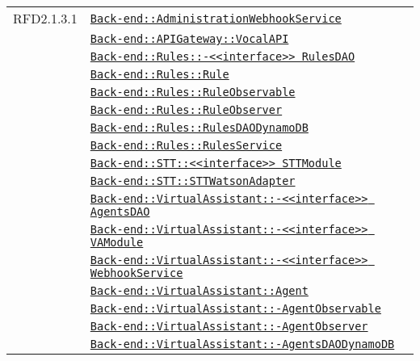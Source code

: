 \begin{longtable}{|>{\centering}m{3cm}|m{10cm}<{\centering}|}
RFD2.1.3.1 & \hyperref[Back-end::AdministrationWebhookService]{\texttt{Back-end::AdministrationWebhookService}}\\
& \hyperref[Back-end::APIGateway::VocalAPI]{\texttt{Back-end::APIGateway::VocalAPI}}\\
& \hyperref[Back-end::Rules::<<interface>> RulesDAO]{\texttt{Back-end::Rules::-\linebreak <<interface>> RulesDAO}}\\
& \hyperref[Back-end::Rules::Rule]{\texttt{Back-end::Rules::Rule}}\\
& \hyperref[Back-end::Rules::RuleObservable]{\texttt{Back-end::Rules::RuleObservable}}\\
& \hyperref[Back-end::Rules::RuleObserver]{\texttt{Back-end::Rules::RuleObserver}}\\
& \hyperref[Back-end::Rules::RulesDAODynamoDB]{\texttt{Back-end::Rules::RulesDAODynamoDB}}\\
& \hyperref[Back-end::Rules::RulesService]{\texttt{Back-end::Rules::RulesService}}\\
& \hyperref[Back-end::STT::<<interface>> STTModule]{\texttt{Back-end::STT::<<interface>> STTModule}}\\
& \hyperref[Back-end::STT::STTWatsonAdapter]{\texttt{Back-end::STT::STTWatsonAdapter}}\\
& \hyperref[Back-end::VirtualAssistant::<<interface>> AgentsDAO]{\texttt{Back-end::VirtualAssistant::-\linebreak <<interface>> AgentsDAO}}\\
& \hyperref[Back-end::VirtualAssistant::<<interface>> VAModule]{\texttt{Back-end::VirtualAssistant::-\linebreak <<interface>> VAModule}}\\
& \hyperref[Back-end::VirtualAssistant::<<interface>> WebhookService]{\texttt{Back-end::VirtualAssistant::-\linebreak <<interface>> WebhookService}}\\
& \hyperref[Back-end::VirtualAssistant::Agent]{\texttt{Back-end::VirtualAssistant::Agent}}\\
& \hyperref[Back-end::VirtualAssistant::AgentObservable]{\texttt{Back-end::VirtualAssistant::-\linebreak AgentObservable}}\\
& \hyperref[Back-end::VirtualAssistant::AgentObserver]{\texttt{Back-end::VirtualAssistant::-\linebreak AgentObserver}}\\
& \hyperref[Back-end::VirtualAssistant::AgentsDAODynamoDB]{\texttt{Back-end::VirtualAssistant::-\linebreak AgentsDAODynamoDB}}\\

\end{longtable}
